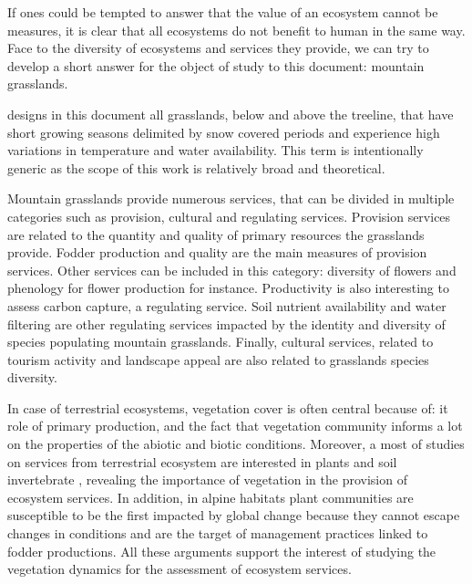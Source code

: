 If ones could be tempted to answer that the value of an ecosystem cannot be measures, it is clear that all ecosystems do not benefit to human in the same way. Face to the diversity of ecosystems and services they provide, we can try to develop a short answer for the object of study to this document: mountain grasslands.

 designs in this document all grasslands, below and above the treeline, that have short growing seasons delimited by snow covered periods and experience high variations in temperature and water availability. This term is intentionally generic as the scope of this work is relatively broad and theoretical.

Mountain grasslands provide numerous services, that can be divided in multiple categories such as provision, cultural and regulating services. Provision services are related to the quantity and quality of primary resources the grasslands provide. Fodder production and quality are the main measures of provision services. Other services can be included in this category: diversity of flowers and phenology for flower production for instance. Productivity is also interesting to assess carbon capture, a regulating service. Soil nutrient availability and water filtering are other regulating services impacted by the identity and diversity of species populating mountain grasslands. Finally, cultural services, related to tourism activity and landscape appeal are also related to grasslands species diversity.


In case of terrestrial ecosystems, vegetation cover is often central because of: it role of primary production, and the fact that vegetation community informs a lot on the properties of the abiotic and biotic conditions. Moreover, a most of studies on services from terrestrial ecosystem are interested in plants and soil invertebrate \cite{de_bello_towards_2010}, revealing the importance of vegetation in the provision of ecosystem services. In addition, in alpine habitats plant communities are susceptible to be the first impacted by global change because they cannot escape changes in conditions and are the target of management practices linked to fodder productions. All these arguments support the interest of studying the vegetation dynamics for the assessment of ecosystem services.

